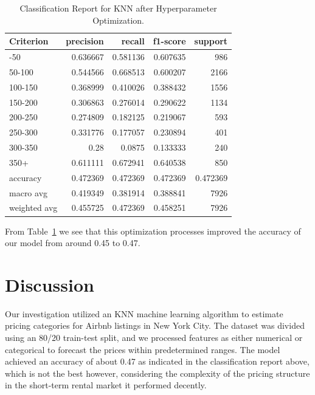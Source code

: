 \documentclass[
  letterpaper,
  DIV=11,
  numbers=noendperiod]{scrartcl}
\begin{document}
\begin{longtable}[]{@{}lrrrr@{}}

\caption{\label{tbl-hyperparam-clf}Classification Report for KNN after
Hyperparameter Optimization.}

\tabularnewline

\toprule\noalign{}
Criterion & precision & recall & f1-score & support \\
\midrule\noalign{}
\endhead
\bottomrule\noalign{}
\endlastfoot
0-50 & 0.636667 & 0.581136 & 0.607635 & 986 \\
50-100 & 0.544566 & 0.668513 & 0.600207 & 2166 \\
100-150 & 0.368999 & 0.410026 & 0.388432 & 1556 \\
150-200 & 0.306863 & 0.276014 & 0.290622 & 1134 \\
200-250 & 0.274809 & 0.182125 & 0.219067 & 593 \\
250-300 & 0.331776 & 0.177057 & 0.230894 & 401 \\
300-350 & 0.28 & 0.0875 & 0.133333 & 240 \\
350+ & 0.611111 & 0.672941 & 0.640538 & 850 \\
accuracy & 0.472369 & 0.472369 & 0.472369 & 0.472369 \\
macro avg & 0.419349 & 0.381914 & 0.388841 & 7926 \\
weighted avg & 0.455725 & 0.472369 & 0.458251 & 7926 \\

\end{longtable}

From Table~\ref{tbl-hyperparam-clf} we see that this optimization
processes improved the accuracy of our model from around 0.45 to 0.47.

\section{Discussion}\label{discussion}

Our investigation utilized an KNN machine learning algorithm to estimate
pricing categories for Airbnb listings in New York City. The dataset was
divided using an 80/20 train-test split, and we processed features as
either numerical or categorical to forecast the prices within
predetermined ranges. The model achieved an accuracy of about 0.47 as
indicated in the classification report above, which is not the best
however, considering the complexity of the pricing structure in the
short-term rental market it performed decently.
\end{document}
